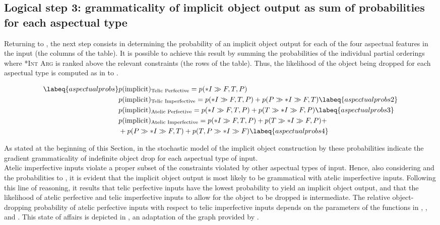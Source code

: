 \subsection{Logical step 3: grammaticality of implicit object output as sum of probabilities for each aspectual type} 
Returning to , the next step consists in determining the probability of an implicit object output for each of the four aspectual features in the input (the columns of the table). It is possible to achieve this result by summing the probabilities of the individual partial orderings where \textsc{*Int Arg} is ranked above the relevant constraints (the rows of the table). Thus, the likelihood of the object being dropped for each aspectual type is computed as in  to .

\begin{align}  \labeq{aspectualprobs}
    & p(\text{implicit})\textsubscript{Telic Perfective} = p(*I \gg {F, T, P}) \\
    & p(\text{implicit})\textsubscript{Telic Imperfective} = p(*I \gg {F, T, P}) + p(P \gg *I \gg {F, T}) \labeq{aspectualprobs2}\\
    & p(\text{implicit})\textsubscript{Atelic Perfective} = p(*I \gg {F, T, P}) + p(T \gg *I \gg {F, P}) \labeq{aspectualprobs3}\\
    & p(\text{implicit})\textsubscript{Atelic Imperfective} = p(*I \gg {F, T, P}) + p(T \gg *I \gg {F, P}) + \nonumber \\ & + p(P \gg *I \gg {F, T}) + p({T, P} \gg *I \gg F) \labeq{aspectualprobs4}
\end{align}

As stated at the beginning of this Section, in the stochastic model of the implicit object construction by \textcite{Medina2007} these probabilities indicate the gradient grammaticality of indefinite object drop for each aspectual type of input.\\
Atelic imperfective inputs violate a proper subset of the constraints violated by other aspectual types of input. Hence, also considering  and the probabilities  to , it is evident that the implicit object output is most likely to be grammatical with atelic imperfective inputs. Following this line of reasoning, it results that telic perfective inputs have the lowest probability to yield an implicit object output, and that the likelihood of atelic perfective and telic imperfective inputs to allow for the object to be dropped is intermediate. The relative object-dropping probability of atelic perfective inputs with respect to telic imperfective inputs depends on the parameters of the functions in , , and . This state of affairs is depicted in , an adaptation of the graph provided by \textcite[108]{Medina2007}.

